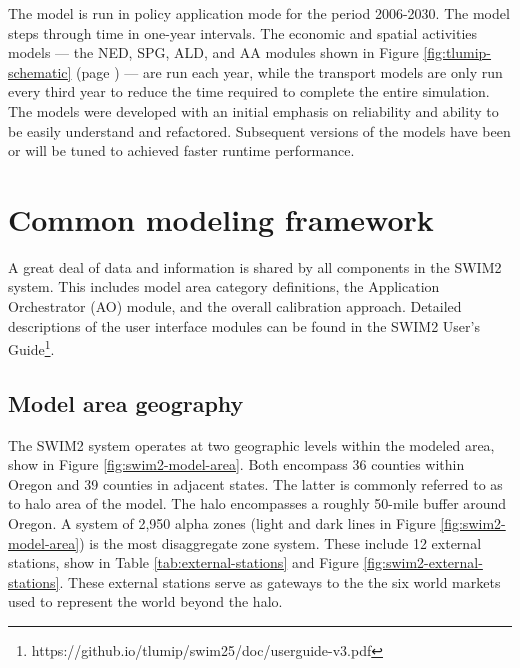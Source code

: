 The model is run in policy application mode for the period 2006-2030. The model steps through time in one-year intervals. The economic and spatial activities models --- the NED, SPG, ALD, and AA modules shown in Figure \ref{fig:tlumip-schematic} (page \pageref{fig:tlumip-schematic}) --- are run each year, while the transport models are only run every third year to reduce the time required to complete the entire simulation. The models were developed with an initial emphasis on reliability and ability to be easily understand and refactored. Subsequent versions of the models have been or will be tuned to achieved faster runtime performance.


\section{Common modeling framework}
A great deal of data and information is shared by all components in the SWIM2 system. This includes model area category definitions, the Application Orchestrator (AO) module, and the overall calibration approach. Detailed descriptions of the user interface modules can be found in the SWIM2 User's Guide\footnote{https://github.io/tlumip/swim25/doc/userguide-v3.pdf}.

\subsection{Model area geography}\label{sec:model-area-geography}
The SWIM2 system operates at two geographic levels within the modeled area, show in Figure \ref{fig:swim2-model-area}. Both encompass 36 counties within Oregon and 39 counties in adjacent states. The latter is commonly referred to as to halo area of the model. The halo encompasses a roughly 50-mile buffer around Oregon. A system of 2,950 alpha zones (light and dark lines in Figure \ref{fig:swim2-model-area}) is the most disaggregate zone system. These include 12 external stations, show in Table \ref{tab:external-stations} and Figure \ref{fig:swim2-external-stations}. These external stations serve as gateways to the the six world markets used to represent the world beyond the halo.

